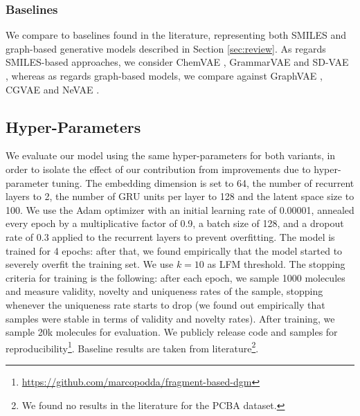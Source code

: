 \subsubsection*{Baselines}
We compare to baselines found in the literature, representing both SMILES and graph-based generative models described in Section \ref{sec:review}. As regards SMILES-based approaches, we consider ChemVAE \citep{gomez2018vaemolecule}, GrammarVAE \citep{kusner2017grammarvae} and SD-VAE \citep{dai2018sdvae}, whereas as regards graph-based models, we compare against GraphVAE \citep{simonovsky2018graphvae}, CGVAE \citep{liu2018cgvae} and NeVAE \citep{samanta2019nevae}.

\subsection{Hyper-Parameters}
We evaluate our model using the same hyper-parameters for both variants, in order to isolate the effect of our contribution from improvements due to hyper-parameter tuning. The embedding dimension is set to 64, the number of recurrent layers to 2, the number of GRU units per layer to 128 and the latent space size to 100. We use the Adam optimizer with an initial learning rate of 0.00001, annealed every epoch by a multiplicative factor of 0.9, a batch size of 128, and a dropout rate of 0.3 applied to the recurrent layers to prevent overfitting. The model is trained for 4 epochs: after that, we found empirically that the model started to severely overfit the training set. We use $k=10$ as LFM threshold. The stopping criteria for training is the following: after each epoch, we sample 1000 molecules and measure validity, novelty and uniqueness rates of the sample, stopping whenever the uniqueness rate starts to drop (we found out empirically that samples were stable in terms of validity and novelty rates). After training, we sample 20k molecules for evaluation. We publicly release code and samples for reproducibility\footnote{\url{https://github.com/marcopodda/fragment-based-dgm}}. Baseline results are taken from literature\footnote{We found no results in the literature for the PCBA dataset.}.

